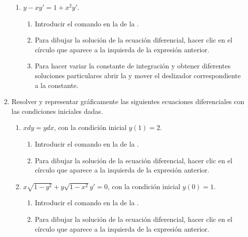 \begin{enumerate}[leftmargin=*]
\begin{enumerate}
      \item $y-xy'=1+x^2y'$.
            \begin{indication}
            \begin{enumerate}
            \item Introducir el comando  en la  de la .
            \item Para dibujar la solución de la ecuación diferencial, hacer clic en el círculo que aparece a la izquierda de la expresión anterior.
            \item Para hacer variar la constante de integración y obtener diferentes soluciones particulares abrir la  y mover el deslizador correspondiente a la constante.
            \end{enumerate}
            \end{indication}
      \end{enumerate}


\item Resolver y representar gráficamente las siguientes ecuaciones diferenciales con las condiciones iniciales dadas.
      \begin{enumerate}
      \item $xdy=ydx$, con la condición inicial $y(1)=2$.
            \begin{indication}
            \begin{enumerate}
            \item Introducir el comando  en la  de la .
            \item Para dibujar la solución de la ecuación diferencial, hacer clic en el círculo que aparece a la izquierda de la expresión anterior.
            \end{enumerate}
            \end{indication}

      \item $x\sqrt{1-y^2}+y\sqrt{1-x^2} y'=0$, con la condición inicial $y(0)=1$.
            \begin{indication}
            \begin{enumerate}
            \item Introducir el comando  en la  de la .
            \item Para dibujar la solución de la ecuación diferencial, hacer clic en el círculo que aparece a la izquierda de la expresión anterior.
            \end{enumerate}
            \end{indication}


\end{enumerate}
\end{enumerate}
